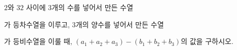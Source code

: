 $2$와 $32$ 사이에 $3$개의 수를 넣어서 만든 수열 \par\smallskip{}\par\smallskip\noindent 가 등차수열을 이루고, $3$개의 양수를 넣어서 만든 수열 \par\smallskip{}\par\smallskip\noindent 가 등비수열을 이룰 때, $(a_1+a_2+a_3)-(b_1+b_2+b_3)$의 값을 구하시오.
